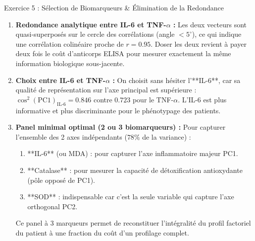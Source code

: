\documentclass[11pt,a4paper]{article}
\begin{document}
\begin{solutionbox}{Exercice 5 : Sélection de Biomarqueurs \& Élimination de la Redondance}
\begin{enumerate}[label=\textbf{\alph*.}]
  \item \textbf{Redondance analytique entre IL-6 et TNF-$\alpha$ :}
  Les deux vecteurs sont quasi-superposés sur le cercle des corrélations (angle $< 5^\circ$), ce qui indique une corrélation colinéaire proche de $r = 0.95$. Doser les deux revient à payer deux fois le coût d'anticorps ELISA pour mesurer exactement la même information biologique sous-jacente.

  \item \textbf{Choix entre IL-6 et TNF-$\alpha$ :}
  On choisit sans hésiter l'**IL-6**, car sa qualité de représentation sur l'axe principal est supérieure : $\cos^2(\text{PC1})_{\text{IL-6}} = 0.846$ contre $0.723$ pour le TNF-$\alpha$. L'IL-6 est plus informative et plus discriminante pour le phénotypage des patients.

  \item \textbf{Panel minimal optimal (2 ou 3 biomarqueurs) :}
  Pour capturer l'ensemble des 2 axes indépendants ($78\%$ de la variance) :
  \begin{enumerate}
    \item **IL-6** (ou MDA) : pour capturer l'axe inflammatoire majeur PC1.
    \item **Catalase** : pour mesurer la capacité de détoxification antioxydante (pôle opposé de PC1).
    \item **SOD** : indispensable car c'est la seule variable qui capture l'axe orthogonal PC2.
  \end{enumerate}
  Ce panel à 3 marqueurs permet de reconstituer l'intégralité du profil factoriel du patient à une fraction du coût d'un profilage complet.
\end{enumerate}
\end{solutionbox}
\end{document}
